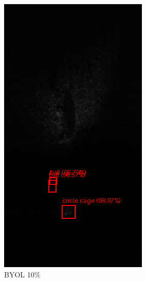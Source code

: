 \documentclass[a0,portrait]{hogent-poster}
\begin{document}
\begin{multicols}{2}
\begin{figure}[H]
\begin{subfigure}{.2\linewidth}
        \includegraphics[width=0.9\linewidth]{1_faster_rcnn_10_byol.png}
        \caption{BYOL 10\%}
    \end{subfigure}%
    \hfill
    \begin{subfigure}{.2\linewidth}
        \centering
        \captionsetup{justification=centering}

\end{subfigure}
\end{figure}
\end{multicols}
\end{document}
